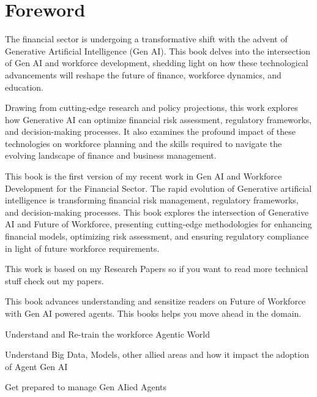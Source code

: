\documentclass[a4paper,headinclude=on,footinclude=on,12pt,oneside]{scrbook}
\begin{document}
\chapter*{Foreword}

The financial sector is undergoing a transformative shift with the advent of Generative Artificial Intelligence (Gen AI). This book delves into the intersection of Gen AI and workforce development, shedding light on how these technological advancements will reshape the future of finance, workforce dynamics, and education.

Drawing from cutting-edge research and policy projections, this work explores how Generative AI can optimize financial risk assessment, regulatory frameworks, and decision-making processes. It also examines the profound impact of these technologies on workforce planning and the skills required to navigate the evolving landscape of finance and business management.

This book is the first version of my recent work in Gen AI and Workforce Development for the Financial Sector.
The rapid evolution of Generative artificial intelligence is transforming financial risk management, regulatory frameworks, and decision-making processes. 
This book explores the intersection of Generative AI and Future of Workforce, presenting cutting-edge methodologies for enhancing financial models, optimizing risk assessment, and ensuring regulatory compliance in light of future workforce requirements. 

This work is based on my Research Papers so if you want to read more technical stuff check out my papers. 



This book advances understanding and sensitize readers on Future of Workforce with Gen AI powered agents. This books helps you move ahead in the domain.

\begin{arrows}
	\item Understand and Re-train the workforce Agentic World
	\item Understand Big Data, Models, other allied areas and how it impact the adoption of Agent Gen AI
	\item Get prepared to manage Gen AIied Agents 
\end{arrows}
\end{document}
